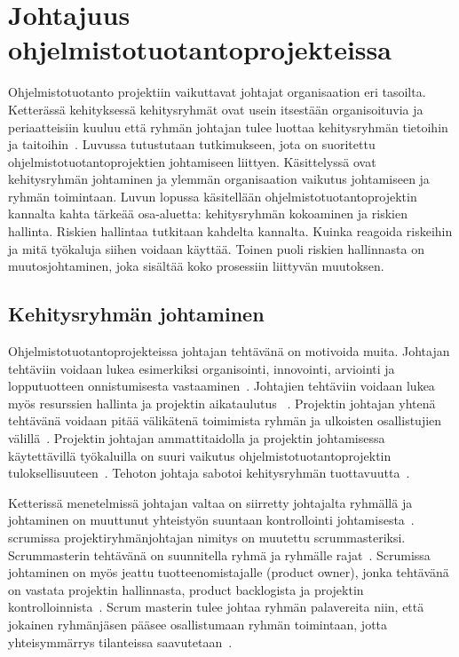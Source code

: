 \documentclass[finnish]{tktltiki2}
\theoremstyle{definition}
\theoremstyle{remark}
\begin{document}
  


\section{Johtajuus ohjelmistotuotantoprojekteissa}

Ohjelmistotuotanto projektiin vaikuttavat johtajat organisaation eri tasoilta. Ketterässä kehityksessä kehitysryhmät ovat usein itsestään organisoituvia ja periaatteisiin kuuluu että ryhmän johtajan tulee luottaa kehitysryhmän tietoihin ja taitoihin~\cite{fowler2001agile}. Luvussa tutustutaan tutkimukseen, jota on suoritettu ohjelmistotuotantoprojektien johtamiseen liittyen. Käsittelyssä ovat kehitysryhmän johtaminen ja ylemmän organisaation vaikutus johtamiseen ja ryhmän toimintaan. Luvun lopussa käsitellään ohjelmistotuotantoprojektin kannalta kahta tärkeää osa-aluetta: kehitysryhmän kokoaminen ja riskien hallinta. Riskien hallintaa tutkitaan kahdelta kannalta. Kuinka reagoida riskeihin ja mitä työkaluja siihen voidaan käyttää. Toinen puoli riskien hallinnasta on muutosjohtaminen, joka sisältää koko prosessiin liittyvän muutoksen.

\subsection{Kehitysryhmän johtaminen}

Ohjelmistotuotantoprojekteissa johtajan tehtävänä on motivoida muita. Johtajan tehtäviin voidaan lukea esimerkiksi organisointi, innovointi, arviointi ja lopputuotteen onnistumisesta vastaaminen~\cite{4017705}. Johtajien tehtäviin voidaan lukea myös resurssien hallinta ja projektin aikataulutus ~\cite{Dhomne:2012:ITL:2382887.2382899}. Projektin johtajan yhtenä tehtävänä voidaan pitää välikätenä toimimista ryhmän ja ulkoisten osallistujien välillä~\cite{McLeod:2011:FAS:1978802.1978803}. Projektin johtajan ammattitaidolla ja projektin johtamisessa käytettävillä työkaluilla on suuri vaikutus ohjelmistotuotantoprojektin tuloksellisuuteen~\cite{McLeod:2011:FAS:1978802.1978803}. Tehoton johtaja sabotoi kehitysryhmän tuottavuutta~\cite{bradley1997effect}.

Ketterissä menetelmissä johtajan valtaa on siirretty johtajalta ryhmällä ja johtaminen on muuttunut yhteistyön suuntaan kontrollointi johtamisesta~\cite{Nerur:2005:CMA:1060710.1060712}. scrumissa projektiryhmänjohtajan nimitys on muutettu scrummasteriksi. Scrummasterin tehtävänä on suunnitella ryhmä ja ryhmälle rajat~\cite{4755768}. Scrumissa johtaminen on myös jeattu tuotteenomistajalle (product owner), jonka tehtävänä on vastata projektin hallinnasta, product backlogista ja projektin kontrolloinnista~\cite{4755768}. Scrum masterin tulee johtaa ryhmän palavereita niin, että jokainen ryhmänjäsen pääsee osallistumaan ryhmän toimintaan, jotta yhteisymmärrys tilanteissa saavutetaan~\cite{bradley1997effect}. 
\end{document}
